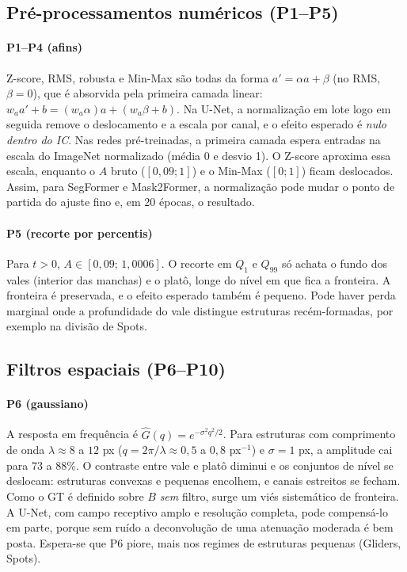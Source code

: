 \subsection{Pré-processamentos numéricos (P1--P5)}
\paragraph{P1--P4 (afins)} Z-score, RMS, robusta e Min-Max são todas da forma
$a' = \alpha a + \beta$ (no RMS, $\beta=0$), que é absorvida pela primeira camada linear:
$w_a a' + b = (w_a\alpha)a + (w_a\beta + b)$. Na U-Net, a normalização em lote \cite{ioffe2015} logo em seguida remove o deslocamento e a
escala por canal, e o efeito esperado é \emph{nulo dentro do IC}. Nas redes pré-treinadas, a
primeira camada espera entradas na escala do ImageNet normalizado (média 0 e desvio 1). O Z-score
aproxima essa escala, enquanto o $A$ bruto ($[0{,}09;1]$) e o Min-Max ($[0;1]$) ficam deslocados.
Assim, para SegFormer e Mask2Former, a normalização pode mudar o ponto de partida do ajuste fino
e, em 20 épocas, o resultado. 

\paragraph{P5 (recorte por percentis)} Para $t>0$, $A\in[0{,}09;\,1{,}0006]$. O recorte em $Q_1$ e $Q_{99}$ só
achata o fundo dos vales (interior das manchas) e o platô, longe do nível em que fica a fronteira.
A fronteira é preservada, e o efeito esperado também é pequeno. Pode haver perda marginal onde a
profundidade do vale distingue estruturas recém-formadas, por exemplo na divisão de Spots.

\subsection{Filtros espaciais (P6--P10)}
\paragraph{P6 (gaussiano)} A resposta em frequência é $\hat{G}(q) = e^{-\sigma^2 q^2/2}$. Para
estruturas com comprimento de onda $\lambda\approx8$ a $12$ px ($q = 2\pi/\lambda\approx0{,}5$ a
$0{,}8$ px$^{-1}$) e $\sigma = 1$ px, a amplitude cai para 73 a 88\%. O contraste entre vale e platô
diminui e os conjuntos de nível se deslocam: estruturas convexas e pequenas encolhem, e canais
estreitos se fecham. Como o GT é definido sobre $B$ \emph{sem} filtro, surge um viés sistemático
de fronteira. A U-Net, com campo receptivo amplo e resolução completa, pode compensá-lo em parte,
porque sem ruído a deconvolução de uma atenuação moderada é bem posta. Espera-se que P6 piore,
mais nos regimes de estruturas pequenas (Gliders, Spots).

